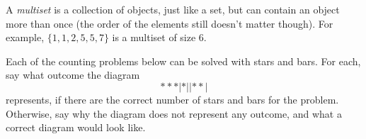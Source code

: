 \begin{questions}



\question A \emph{multiset} is a collection of objects, just like a set, but can contain an object more than once (the order of the elements still doesn't matter though).  For example, $\{1,1, 2, 5, 5, 7\}$ is a multiset of size 6.

	\begin{answer}
	\end{answer}



\question Each of the counting problems below can be solved with stars and bars.  For each, say what outcome the diagram
\[***|*||**|\]
represents, if there are the correct number of stars and bars for the problem.  Otherwise, say why the diagram does not represent any outcome, and what a correct diagram would look like.

\end{questions}
